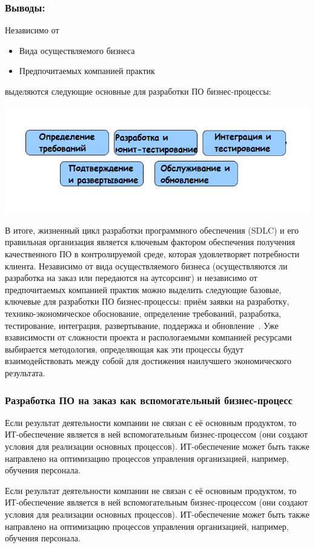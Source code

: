 \documentclass{../industrial-development}
\begin{document}
\begin{frame} \frametitle{Выводы:}
Независимо от 
\begin{itemize}
	\item Вида осуществляемого бизнеса
	\item Предпочитаемых компанией практик
\end{itemize}

выделяются следующие \alert{основные} для разработки ПО бизнес-процессы:
\centerline{\includegraphics[width=1.35\textheight]{bp1.png}}
\end{frame}
\lecturenotes
В итоге, жизненный цикл разработки программного обеспечения (SDLC) и его правильная организация является ключевым фактором обеспечения получения качественного ПО в контролируемой среде, которая удовлетворяет потребности клиента. 
Независимо от вида осуществляемого бизнеса (осуществляются ли разработка на заказ или передаются на аутсорсинг) и независимо от предпочитаемых компанией практик можно выделить следующие базовые, ключевые для разработки ПО бизнес-процессы: приём заявки на разработку, технико-экономическое обоснование, определение требований, разработка, тестирование, интеграция, развертывание, поддержка и обновление~\cite{SDLC}. Уже взависимости от сложности проекта и распологаемыми компанией ресурсами выбирается методология, определяющая как эти процессы будут взаимодействовать между собой для достижения наилучшего экономического результата.


\begin{frame} \frametitle{Разработка ПО на заказ как \alert{вспомогательный} бизнес-процесс}

\begin {block}{}
Если результат деятельности компании не связан с её основным продуктом, то ИТ-обеспечение является в ней \alert{вспомогательным} бизнес-процессом (они создают условия для реализации основных процессов). ИТ-обеспечение может быть также направлено на оптимизацию процессов управления организацией, например, обучения персонала.
\end {block}
\end{frame}
\lecturenotes
Если результат деятельности компании не связан с её основным продуктом, то ИТ-обеспечение является в ней \alert{вспомогательным} бизнес-процессом (они создают условия для реализации основных процессов). ИТ-обеспечение может быть также направлено на оптимизацию процессов управления организацией, например, обучения персонала.
\end{document}
